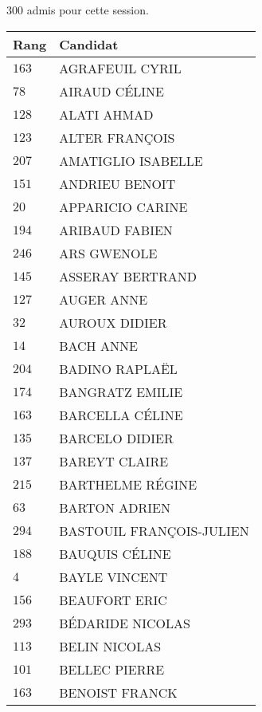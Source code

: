 



  $300$ admis pour cette session.

  \begin{xltabular}{\linewidth}{|l|X|}
    \hline
    \textbf{Rang} & \textbf{Candidat} \\
    \hline
    $163$ & AGRAFEUIL CYRIL \\
    \hline
    $78$ & AIRAUD CÉLINE \\
    \hline
    $128$ & ALATI AHMAD \\
    \hline
    $123$ & ALTER FRANÇOIS \\
    \hline
    $207$ & AMATIGLIO ISABELLE \\
    \hline
    $151$ & ANDRIEU BENOIT \\
    \hline
    $20$ & APPARICIO CARINE \\
    \hline
    $194$ & ARIBAUD FABIEN \\
    \hline
    $246$ & ARS GWENOLE \\
    \hline
    $145$ & ASSERAY BERTRAND \\
    \hline
    $127$ & AUGER ANNE \\
    \hline
    $32$ & AUROUX DIDIER \\
    \hline
    $14$ & BACH ANNE \\
    \hline
    $204$ & BADINO RAPLAËL \\
    \hline
    $174$ & BANGRATZ EMILIE \\
    \hline
    $163$ & BARCELLA CÉLINE \\
    \hline
    $135$ & BARCELO DIDIER \\
    \hline
    $137$ & BAREYT CLAIRE \\
    \hline
    $215$ & BARTHELME RÉGINE \\
    \hline
    $63$ & BARTON ADRIEN \\
    \hline
    $294$ & BASTOUIL FRANÇOIS-JULIEN \\
    \hline
    $188$ & BAUQUIS CÉLINE \\
    \hline
    $4$ & BAYLE VINCENT \\
    \hline
    $156$ & BEAUFORT ERIC \\
    \hline
    $293$ & BÉDARIDE NICOLAS \\
    \hline
    $113$ & BELIN NICOLAS \\
    \hline
    $101$ & BELLEC PIERRE \\
    \hline
    $163$ & BENOIST FRANCK \\

\end{xltabular}
